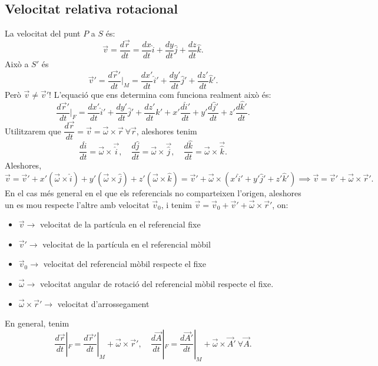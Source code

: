 \subsection{Velocitat relativa rotacional}
La velocitat del punt $P$ a $S$ és:
\[\vec v=\dfrac{d\vec r}{dt}=\dfrac{dx}{dt}\hat i+\dfrac{dy}{dt}\hat j+\dfrac{dz}{dt}\hat k.\]
Això a $S'$ és
\[\vec v'=\dfrac{d\vec r'}{dt}|_M=\dfrac{dx'}{dt}\hat i'+\dfrac{dy'}{dt}\hat j'+\dfrac{dz'}{dt}\hat k'.\]
Però $\vec v\neq\vec v'$! L'equació que ens determina com funciona realment això és:
\[
\dfrac{d\vec r'}{dt}|_F=\dfrac{dx'}{dt}\hat i'+\dfrac{dy'}{dt}\hat j'+\dfrac{dz'}{dt}\hat k'+
x'\dfrac{d\hat i'}{dt}+y'\dfrac{d\hat j'}{dt}+z'\dfrac{d\hat k'}{dt}.
\]
Utilitzarem que $\dfrac{d\vec r}{dt}=\vec v=\vec\omega\times\vec r\ \forall\vec r$, aleshores tenim
\[
\dfrac{d\hat i}{dt}=\vec\omega\times\vec\hat i,
\quad
\dfrac{d\hat j}{dt}=\vec\omega\times\vec\hat j,
\quad
\dfrac{d\hat k}{dt}=\vec\omega\times\vec\hat k.
\]
Aleshores,
\[
\vec v=\vec v'+x'(\vec\omega\times\hat i)+y'(\vec\omega\times\hat j)+z'(\vec\omega\times\hat k)=\vec v'+\vec\omega\times(x'\hat i'+y'\hat j'+z'\hat k')\implies\vec v=\vec v'+\vec\omega\times\vec r'.
\]
En el cas més general en el que els referencials no comparteixen l'origen, aleshores un es mou respecte l'altre amb velocitat $\vec v_0$, i tenim $\vec v=\vec v_0+\vec v'+\vec\omega\times\vec r'$,
on:
\begin{itemize}
	\item $\vec v\longrightarrow$ velocitat de la partícula en el referencial fixe
	\item $\vec v'\longrightarrow$ velocitat de la partícula en el referencial mòbil
	\item $\vec v_0\longrightarrow$ velocitat del referencial mòbil respecte el fixe
	\item $\vec\omega\longrightarrow$ velocitat angular de rotació del referencial mòbil respecte el fixe.
	\item $\vec\omega\times\vec r'\longrightarrow$ velocitat d'arrossegament
\end{itemize}
En general, tenim
\[
\dfrac{d\vec r}{dt}|_F=\dfrac{d\vec r'}{dt}|_M+\vec\omega\times\vec r',\quad 
\dfrac{d\vec A}{dt}|_F=\dfrac{d\vec A'}{dt}|_M+\vec\omega\times\vec A'\ \forall\vec A.\]


